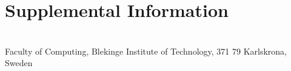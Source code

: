 \documentclass[a4paper,twoside]{bth}
\newcommand{\faculty}{Computing}
\begin{document}




\appendix
\chapter{Supplemental Information}


\cleardoublepage
\thispagestyle{empty}
\vspace*{\fill}
\clearpage{\thispagestyle{empty}}
\changepage{3cm}{1cm}{-0.5cm}{-0.5cm}{}{-1.5cm}{}{}{}
\vspace*{\fill}
\center

{\bthcsnotextlogo{3cm}}
\\
\noindent\makebox[\linewidth]{\rule{\textwidth}{1pt}} 
Faculty of \faculty, Blekinge Institute of Technology, 371 79 Karlskrona, Sweden
\end{document}
